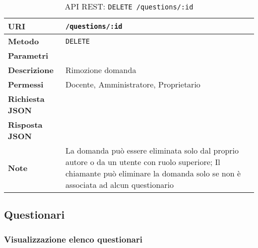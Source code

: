         \begin{table}[H]
            \begin{center}
                \begin{tabular}{p{} p{}}
                    \toprule
                    \textbf{URI} & \texttt{/questions/:id} \\ \midrule
                    \textbf{Metodo} & \texttt{DELETE} \\ \midrule
                    \textbf{Parametri} & \\ \midrule
                    \textbf{Descrizione} & Rimozione domanda \\ \midrule
                    \textbf{Permessi} & Docente, Amministratore, Proprietario  \\ \midrule
                    \textbf{Richiesta JSON} & \\ \midrule
                    \textbf{Risposta JSON} & \\ \midrule
                    \textbf{Note} & La domanda può essere eliminata solo dal proprio autore
                        o da un utente con ruolo superiore; Il chiamante può eliminare la domanda solo se non è associata ad alcun questionario  \\
                    \bottomrule
                \end{tabular}
                \caption{API REST: \texttt{DELETE /questions/:id}}
            \end{center}
        \end{table}

\subsection{Questionari}

    \subsubsection{Visualizzazione elenco questionari}


